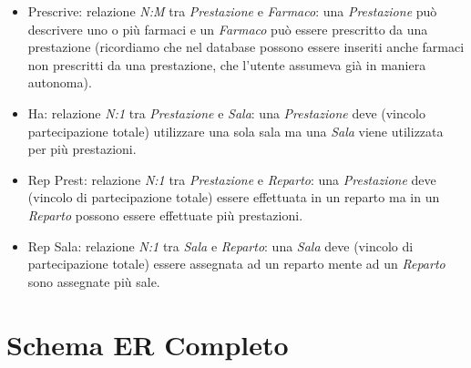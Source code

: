 \documentclass[paper=a4, fontsize=11pt,x11names]{report}
\begin{document}
\begin{itemize}
\item Prescrive: relazione \textit{N:M} tra \textit{Prestazione} e \textit{Farmaco}: una \textit{Prestazione} può descrivere uno o più farmaci e un \textit{Farmaco} può essere prescritto da una prestazione (ricordiamo che nel database possono essere inseriti anche farmaci non prescritti da una prestazione, che l'utente assumeva già in maniera autonoma).
\item Ha: relazione \textit{N:1} tra \textit{Prestazione} e \textit{Sala}: una \textit{Prestazione} deve (vincolo partecipazione totale) utilizzare una sola sala ma una \textit{Sala} viene utilizzata per più prestazioni.
\item Rep Prest: relazione \textit{N:1} tra \textit{Prestazione} e \textit{Reparto}: una \textit{Prestazione} deve (vincolo di partecipazione totale) essere effettuata in un reparto ma in un \textit{Reparto} possono essere effettuate più prestazioni.
\item Rep Sala: relazione \textit{N:1} tra \textit{Sala} e \textit{Reparto}: una \textit{Sala} deve (vincolo di partecipazione totale) essere assegnata ad un reparto mente ad un \textit{Reparto} sono assegnate più sale. 
\end{itemize}


\section{Schema ER Completo}
\end{document}
